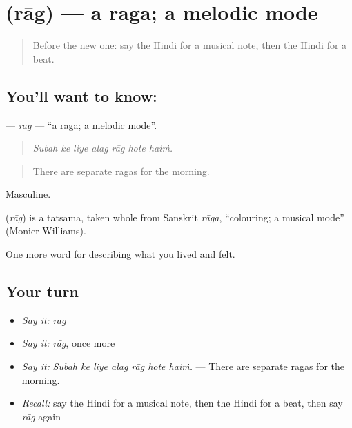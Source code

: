 \section[\texorpdfstring{\hi{राग} (rāg)}{राग (rāg)}]{ (rāg) — a raga; a melodic mode}

\label{lesson:HI-C530-rag}



\begin{quote}
Before the new one: say the Hindi for a musical note, then the Hindi for a beat.
\end{quote}

\subsection*{You'll want to know: }
\textbf{} — \emph{rāg} — \textquotedblleft{}a raga; a melodic mode\textquotedblright{}.

\begin{quote}
      
\end{quote}

\begin{quote}
\emph{Subah ke liye alag rāg hote haiṁ.}
\end{quote}

\begin{quote}
There are separate ragas for the morning.
\end{quote}

Masculine.

\begin{cousinweb}
\textbf{} (\emph{rāg}) is a tatsama, taken whole from Sanskrit \emph{rāga}, \textquotedblleft{}colouring; a musical mode\textquotedblright{} (Monier-Williams).
\end{cousinweb}

\begin{grammarlens}[title={What you've built}]
One more word for describing what you lived and felt.
\end{grammarlens}

\subsection*{Your turn}
\begin{itemize}
\raggedright
  \item \emph{Say it:} \emph{rāg}
  \item \emph{Say it:} \emph{rāg}, once more
  \item \emph{Say it:} \emph{Subah ke liye alag rāg hote haiṁ.} — There are separate ragas for the morning.
  \item \emph{Recall:} say the Hindi for a musical note, then the Hindi for a beat, then say \emph{rāg} again
\end{itemize}

